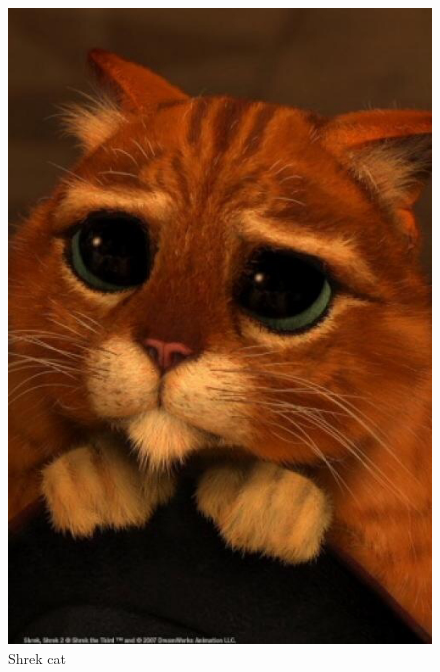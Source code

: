 \documentclass[a4paper]{article}
\begin{document}
\begin{figure}[h] %
    \centering
    \includegraphics[scale=0.2]{Shrek.jpg}
    \caption{Shrek cat}
    \label{fig:Label_cat}
\end{figure}
\end{document}
